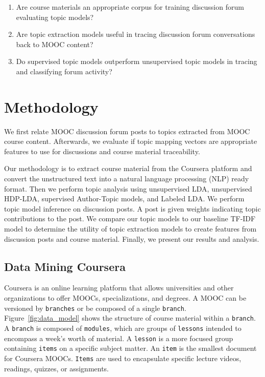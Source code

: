 \documentclass[sigconf, anonymous]{acmart}
\begin{document}
\begin{enumerate}[label=\textbf{RQ\arabic*:}]
    \item Are course materials an appropriate corpus for training discussion forum evaluating topic models? %
    \item Are topic extraction models useful in tracing discussion forum conversations back to MOOC content? %
    \item Do supervised topic models outperform unsupervised topic models in tracing and classifying forum activity? %
\end{enumerate}


\section{Methodology}
We first relate MOOC discussion forum posts to topics extracted from MOOC course content.
Afterwards, we evaluate if topic mapping vectors are appropriate features to use for discussions and course material traceability.

Our methodology is to extract course material from the Coursera platform and convert the unstructured text into a natural language processing (NLP) ready format.
Then we perform topic analysis using unsupervised LDA, unsupervised HDP-LDA, supervised Author-Topic models, and Labeled LDA.
We perform topic model inference on discussion posts. A post is given weights indicating topic contributions to the post.
We compare our topic models to our baseline TF-IDF model to determine the utility of topic extraction models to create features from discussion posts and course material.
Finally, we present our results and analysis.

\subsection{Data Mining Coursera}
Coursera is an online learning platform that allows universities and other organizations to offer MOOCs, specializations, and degrees.
A MOOC can be versioned by \texttt{branches} or be composed of a single \texttt{branch}.
Figure~\ref{fig:data_model} shows the structure of course material within a \texttt{branch}.
A \texttt{branch} is composed of \texttt{modules}, which are groups of \texttt{lessons} intended to encompass a week's worth of material.
A \texttt{lesson} is a more focused group containing \texttt{items} on a specific subject matter.
An \texttt{item} is the smallest document for Coursera MOOCs. \texttt{Items} are used to encapsulate specific lecture videos, readings, quizzes, or assignments.
\end{document}
